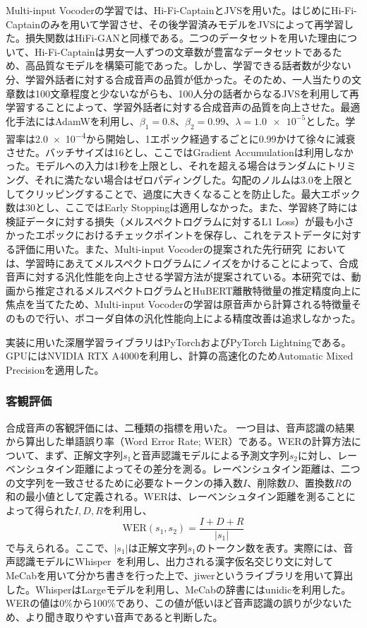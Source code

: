 \documentclass[12pt]{jarticle}
\numberwithin{equation}{section}    %
\numberwithin{figure}{section}      %
\numberwithin{table}{section}      %
\begin{document}
Multi-input Vocoderの学習では、Hi-Fi-CaptainとJVSを用いた。はじめにHi-Fi-Captainのみを用いて学習させ、その後学習済みモデルをJVSによって再学習した。損失関数はHiFi-GANと同様である。二つのデータセットを用いた理由について、Hi-Fi-Captainは男女一人ずつの文章数が豊富なデータセットであるため、高品質なモデルを構築可能であった。しかし、学習できる話者数が少ない分、学習外話者に対する合成音声の品質が低かった。そのため、一人当たりの文章数は100文章程度と少ないながらも、100人分の話者からなるJVSを利用して再学習することによって、学習外話者に対する合成音声の品質を向上させた。最適化手法にはAdamWを利用し、$\beta_{1} = 0.8$、$\beta_{2} = 0.99$、$\lambda = \num{1.0e-5}$とした。学習率は\num{2.0e-4}から開始し、1エポック経過するごとに0.99かけて徐々に減衰させた。バッチサイズは16とし、ここではGradient Accumulationは利用しなかった。モデルへの入力は1秒を上限とし、それを超える場合はランダムにトリミング、それに満たない場合はゼロパディングした。勾配のノルムは3.0を上限としてクリッピングすることで、過度に大きくなることを防止した。最大エポック数は30とし、ここではEarly Stoppingは適用しなかった。また、学習終了時には検証データに対する損失（メルスペクトログラムに対するL1 Loss）が最も小さかったエポックにおけるチェックポイントを保存し、これをテストデータに対する評価に用いた。また、Multi-input Vocoderの提案された先行研究~\cite{choi2023intelligible}においては、学習時にあえてメルスペクトログラムにノイズをかけることによって、合成音声に対する汎化性能を向上させる学習方法が提案されている。本研究では、動画から推定されるメルスペクトログラムとHuBERT離散特徴量の推定精度向上に焦点を当てたため、Multi-input Vocoderの学習は原音声から計算される特徴量そのもので行い、ボコーダ自体の汎化性能向上による精度改善は追求しなかった。

実装に用いた深層学習ライブラリはPyTorchおよびPyTorch Lightningである。GPUにはNVIDIA RTX A4000を利用し、計算の高速化のためAutomatic Mixed Precisionを適用した。

\subsubsection{客観評価}
合成音声の客観評価には、二種類の指標を用いた。
一つ目は、音声認識の結果から算出した単語誤り率（Word Error Rate; WER）である。WERの計算方法について、まず、正解文字列$s_{1}$と音声認識モデルによる予測文字列$s_{2}$に対し、レーベンシュタイン距離によってその差分を測る。レーベンシュタイン距離は、二つの文字列を一致させるために必要なトークンの挿入数$I$、削除数$D$、置換数$R$の和の最小値として定義される。WERは、レーベンシュタイン距離を測ることによって得られた$I, D, R$を利用し、
\begin{equation}
    \text{WER}(s_{1}, s_{2}) = \frac{I + D + R}{|s_{1}|}
\end{equation}
で与えられる。ここで、$|s_{1}|$は正解文字列$s_{1}$のトークン数を表す。実際には、音声認識モデルにWhisper~\cite{radford2023robust}を利用し、出力される漢字仮名交じり文に対してMeCabを用いて分かち書きを行った上で、jiwerというライブラリを用いて算出した。WhisperはLargeモデルを利用し、MeCabの辞書にはunidicを利用した。WERの値は0\%から100\%であり、この値が低いほど音声認識の誤りが少ないため、より聞き取りやすい音声であると判断した。
\end{document}
